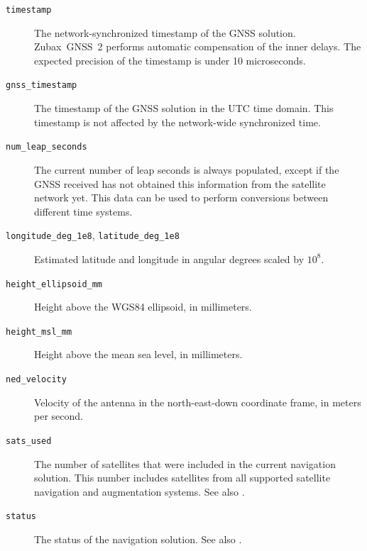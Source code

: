\documentclass{zubaxdoc}
\begin{document}
\begin{description}
    \item[\texttt{timestamp}] The network-synchronized timestamp of the GNSS solution.
    Zubax~GNSS~2 performs automatic compensation of the inner delays.
    The expected precision of the timestamp is under 10 microseconds.

    \item[\texttt{gnss\_timestamp}] The timestamp of the GNSS solution in the UTC time domain.
    This timestamp is not affected by the network-wide synchronized time.

    \item[\texttt{num\_leap\_seconds}] The current number of leap seconds is always populated,
    except if the GNSS received has not obtained this information from the satellite network yet.
    This data can be used to perform conversions between different time systems.

    \item[\texttt{longitude\_deg\_1e8}, \texttt{latitude\_deg\_1e8}] Estimated latitude and longitude
    in angular degrees scaled by $10^8$.

    \item[\texttt{height\_ellipsoid\_mm}] Height above the WGS84 ellipsoid, in millimeters.

    \item[\texttt{height\_msl\_mm}] Height above the mean sea level, in millimeters.

    \item[\texttt{ned\_velocity}] Velocity of the antenna in the north-east-down coordinate frame,
    in meters per second.
    
    \item[\texttt{sats\_used}] The number of satellites that were included in the current navigation solution.
    This number includes satellites from all supported satellite navigation and augmentation systems.
    See also .
    
    \item[\texttt{status}] The status of the navigation solution.
    See also .
    

\end{description}
\end{document}
